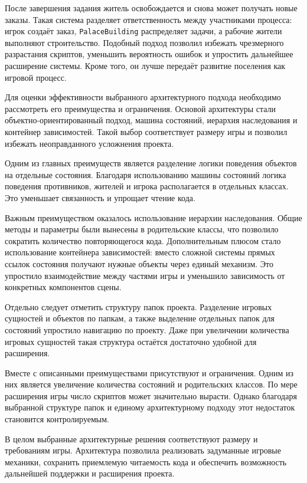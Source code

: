 \documentclass[a4paper,12pt]{report}
\begin{document}
После завершения задания житель освобождается и снова может получать новые заказы. Такая система разделяет ответственность между участниками процесса: игрок создаёт заказ, \texttt{PalaceBuilding} распределяет задачи, а рабочие жители выполняют строительство. Подобный подход позволил избежать чрезмерного разрастания скриптов, уменьшить вероятность ошибок и упростить дальнейшее расширение системы. Кроме того, он лучше передаёт развитие поселения как игровой процесс.


Для оценки эффективности выбранного архитектурного подхода необходимо рассмотреть его преимущества и ограничения. Основой архитектуры стали объектно-ориентированный подход, машина состояний, иерархия наследования и контейнер зависимостей. Такой выбор соответствует размеру игры и позволил избежать неоправданного усложнения проекта.

Одним из главных преимуществ является разделение логики поведения объектов на отдельные состояния. Благодаря использованию машины состояний логика поведения противников, жителей и игрока располагается в отдельных классах. Это уменьшает связанность и упрощает чтение кода.

Важным преимуществом оказалось использование иерархии наследования. Общие методы и параметры были вынесены в родительские классы, что позволило сократить количество повторяющегося кода. Дополнительным плюсом стало использование контейнера зависимостей: вместо сложной системы прямых ссылок состояния получают нужные объекты через единый механизм. Это упростило взаимодействие между частями игры и уменьшило зависимость от конкретных компонентов сцены.

Отдельно следует отметить структуру папок проекта. Разделение игровых сущностей и объектов по папкам, а также выделение отдельных папок для состояний упростило навигацию по проекту. Даже при увеличении количества игровых сущностей такая структура остаётся достаточно удобной для расширения.

Вместе с описанными преимуществами присутствуют и ограничения. Одним из них является увеличение количества состояний и родительских классов. По мере расширения игры число скриптов может значительно вырасти. Однако благодаря выбранной структуре папок и единому архитектурному подходу этот недостаток становится контролируемым.

В целом выбранные архитектурные решения соответствуют размеру и требованиям игры. Архитектура позволила реализовать задуманные игровые механики, сохранить приемлемую читаемость кода и обеспечить возможность дальнейшей поддержки и расширения проекта.
\end{document}
